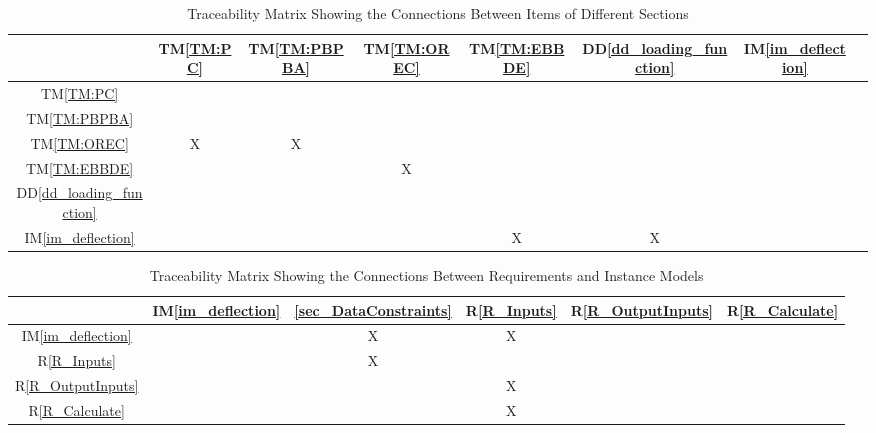 \documentclass[12pt]{article}
\newcommand{\ddref}[1]{DD\ref{#1}}
\newcommand{\tref}[1]{TM\ref{#1}}
\newcommand{\iref}[1]{IM\ref{#1}}
\newcommand{\rref}[1]{R\ref{#1}}
\begin{document}
\begin{table}[h!]
    \centering
    \begin{tabular}{|c|c|c|c|c|c|c|c|}
        \hline
                                    & \tref{TM:PC} & \tref{TM:PBPBA} & \tref{TM:OREC} & \tref{TM:EBBDE} & \ddref{dd_loading_function} & \iref{im_deflection} \\ \hline
        \tref{TM:PC}                &              &                 &                &                 &                             &                      \\ \hline
        \tref{TM:PBPBA}             &              &                 &                &                 &                             &                      \\ \hline
        \tref{TM:OREC}              & X            & X               &                &                 &                             &                      \\ \hline
        \tref{TM:EBBDE}             &              &                 & X              &                 &                             &                      \\ \hline
        \ddref{dd_loading_function} &              &                 &                &                 &                             &                      \\ \hline
        \iref{im_deflection}        &              &                 &                & X               & X                           &                      \\ \hline
    \end{tabular}
    \caption{Traceability Matrix Showing the Connections Between Items of Different Sections}
    \label{Table:trace}
\end{table}


\begin{table}[h!]
    \centering
    \begin{tabular}{|c|c|c|c|c|c|}
        \hline
                              & \iref{im_deflection} & \ref{sec_DataConstraints} & \rref{R_Inputs} & \rref{R_OutputInputs} & \rref{R_Calculate} \\ \hline
        \iref{im_deflection}  &                      & X                         & X               &                       &                    \\ \hline
        \rref{R_Inputs}       &                      & X                         &                 &                       &                    \\ \hline
        \rref{R_OutputInputs} &                      &                           & X               &                       &                    \\ \hline
        \rref{R_Calculate}    &                      &                           & X               &                       &                    \\ \hline
    \end{tabular}
    \caption{Traceability Matrix Showing the Connections Between Requirements and Instance Models}
    \label{Table:R_trace}
\end{table}
\end{document}
